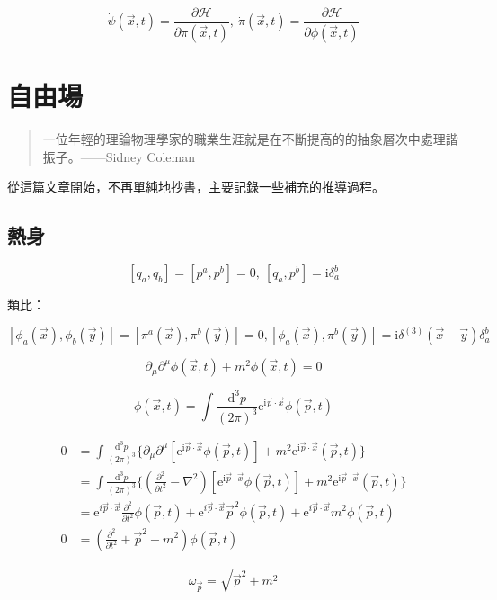 \documentclass{article}
\begin{document}
$$\dot{\psi}(\vec{x},t)=\frac{\partial\mathcal{H}}{\partial\pi(\vec{x},t)},\ \dot\pi(\vec{x},t)=\frac{\partial\mathcal{H}}{\partial\phi(\vec{x},t)}$$

\section{自由場}

\begin{quote}
一位年輕的理論物理學家的職業生涯就是在不斷提高的的抽象層次中處理諧振子。——Sidney Coleman
\end{quote}

從這篇文章開始，不再單純地抄書，主要記錄一些補充的推導過程。

\subsection{熱身}

$$[q_{a},q_{b}]=[p^{a},p^{b}]=0,\ [q_{a},p^b]=\mathrm{i}\delta^b_a$$

類比：

$$[\phi_a(\vec{x}),\phi_b(\vec{y})]=[\pi^a(\vec{x}),\pi^b(\vec{y})]=0, [\phi_{a}(\vec{x}),\pi^b(\vec{y})]=\mathrm{i}\delta^{(3)}(\vec{x}-\vec{y})\delta^b_a$$

$$\partial_{\mu}\partial^{\mu}\phi(\vec{x},t)+m^2\phi(\vec{x},t)=0$$

$$\phi(\vec{x},t)=\int\frac{\mathrm{d}^3p}{(2\pi)^3}\mathrm{e}^{\mathrm{i}\vec{p}\cdot\vec{x}}\phi(\vec{p},t)$$

$$
\begin{aligned}
0 & =\int\frac{\mathrm{d}^3p}{(2\pi)^3}\{\partial_{\mu}\partial^{\mu}[\mathrm{e}^{\mathrm{i}\vec{p}\cdot\vec{x}}\phi(\vec{p},t)]+m^2\mathrm{e}^{\mathrm{i}\vec{p}\cdot\vec{x}}(\vec{p},t)\}               \\
& =\int\frac{\mathrm{d}^3p}{(2\pi)^3}\{(\frac{\partial^2}{\partial t^2}-\nabla^2)[\mathrm{e}^{\mathrm{i}\vec{p}\cdot\vec{x}}\phi(\vec{p},t)]+m^2\mathrm{e}^{\mathrm{i}\vec{p}\cdot\vec{x}}(\vec{p},t)\} \\
& =\mathrm{e}^{i\vec{p}\cdot\vec{x}}\frac{\partial^2}{\partial t^2}\phi(\vec{p},t)+\mathrm{e}^{i\vec{p}\cdot\vec{x}}\vec{p}^2\phi(\vec{p},t)+\mathrm{e}^{i\vec{p}\cdot\vec{x}}m^2\phi(\vec{p},t)        \\
0 & =(\frac{\partial^2}{\partial t^2}+\vec{p}^2+m^2)\phi(\vec{p},t)
\end{aligned}$$

$$\omega_{\vec{p}}=\sqrt{\vec{p}^2+m^2}$$
\end{document}
